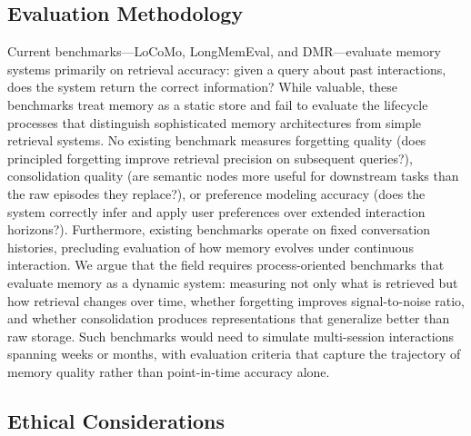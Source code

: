 \subsection{Evaluation Methodology}

Current benchmarks---LoCoMo, LongMemEval, and DMR---evaluate memory
systems primarily on retrieval accuracy: given a query about past
interactions, does the system return the correct information? While
valuable, these benchmarks treat memory as a static store and fail to
evaluate the lifecycle processes that distinguish sophisticated memory
architectures from simple retrieval systems. No existing benchmark
measures forgetting quality (does principled forgetting improve
retrieval precision on subsequent queries?), consolidation quality
(are semantic nodes more useful for downstream tasks than the raw
episodes they replace?), or preference modeling accuracy (does the
system correctly infer and apply user preferences over extended
interaction horizons?). Furthermore, existing benchmarks operate on
fixed conversation histories, precluding evaluation of how memory
evolves under continuous interaction. We argue that the field requires
process-oriented benchmarks that evaluate memory as a dynamic system:
measuring not only what is retrieved but how retrieval changes over
time, whether forgetting improves signal-to-noise ratio, and whether
consolidation produces representations that generalize better than
raw storage. Such benchmarks would need to simulate multi-session
interactions spanning weeks or months, with evaluation criteria that
capture the trajectory of memory quality rather than point-in-time
accuracy alone.

\subsection{Ethical Considerations}

